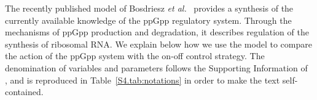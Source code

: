 \documentclass[a4paper,12pt]{article}
\newcommand{\tr}[1]{{#1}}
\begin{document}
\begin{flushleft}
{\Large
\textbf{}
}
\newline

\end{flushleft}

The recently published model of Bosdriesz \textit{et al.}~\cite{bosdriesz_how_2015} provides a synthesis of the currently available knowledge of the ppGpp regulatory system.
\tr{Through the mechanisms of ppGpp production and degradation, it describes regulation of the synthesis of ribosomal RNA.}
We explain below how we use the model to compare the action of the ppGpp system with the on-off control strategy.
The denomination of variables and parameters follows the Supporting Information of~\cite{bosdriesz_how_2015} \tr{, and is reproduced in Table~\ref{S4.tab:notations} in order to make the text self-contained.}
\end{document}
